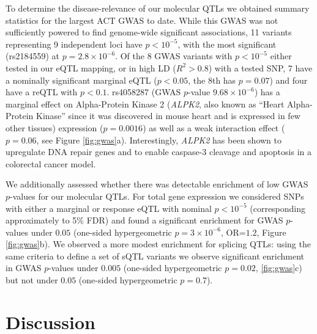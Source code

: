 \documentclass{article}
\begin{document}
To determine the disease-relevance of our molecular QTLs we obtained summary statistics for the largest ACT GWAS to date\cite{Schneider2016}. While this GWAS was not sufficiently powered to find genome-wide significant associations, 11 variants representing 9 independent loci have $p<10^{-5}$, with the most significant (rs2184559) at $p=2.8 \times 10^{-6}$. Of the 8 GWAS variants with $p<10^{-5}$ either tested in our eQTL mapping, or in high LD ($R^2 > 0.8$) with a tested SNP, 7 have a nominally significant marginal eQTL ($p<0.05$, the 8th has $p=0.07$) and four have a reQTL with $p<0.1$. rs4058287 (GWAS $p$-value $9.68\times 10^{-6}$) has a marginal effect on Alpha-Protein Kinase 2 (\emph{ALPK2}, also known as ``Heart Alpha-Protein Kinase'' since it was discovered in mouse heart\cite{ryazanov1999alpha} and is expressed in few other tissues\cite{Mele2015-sc}) expression ($p=0.0016$) as well as a weak interaction effect ($p=0.06$, see Figure \ref{fig:gwas}a). Interestingly, \emph{ALPK2} has been shown to upregulate DNA repair genes and to enable caspase-3 cleavage and apoptosis in a colorectal cancer model\citep{yoshida2012alpk2}. 

We additionally assessed whether there was detectable enrichment of low GWAS $p$-values for our molecular QTLs. For total gene expression we considered SNPs with either a marginal or response eQTL with nominal $p < 10^{-5}$ (corresponding approximately to 5\% FDR) and found a significant enrichment for GWAS $p$-values under $0.05$ (one-sided hypergeometric $p=3 \times 10^{-6}$, OR=$1.2$, Figure \ref{fig:gwas}b). We observed a more modest enrichment for splicing QTLs: using the same criteria to define a set of sQTL variants we observe significant enrichment in GWAS $p$-values under $0.005$ (one-sided hypergeometric $p=0.02$, \ref{fig:gwas}c) but not under $0.05$ (one-sided hypergeometric $p=0.7$).  

\section*{Discussion}
\end{document}

